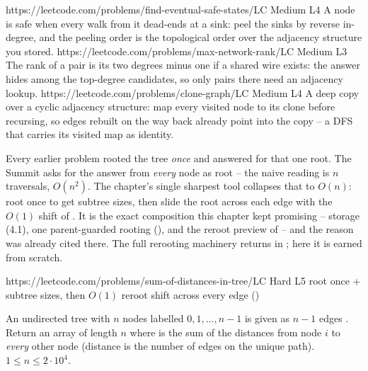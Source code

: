 \begin{mixedset}
    {https://leetcode.com/problems/find-eventual-safe-states/}{LC Medium L4}
    {A node is safe when every walk from it dead-ends at a sink: peel the sinks by
    reverse in-degree, and the peeling order is the topological order over the
    adjacency structure you stored.}
    {https://leetcode.com/problems/max-network-rank/}{LC Medium L3}
    {The rank of a pair is its two degrees minus one if a shared wire exists: the
    answer hides among the top-degree candidates, so only pairs there need an
    adjacency lookup.}
    {https://leetcode.com/problems/clone-graph/}{LC Medium L4}
    {A deep copy over a cyclic adjacency structure: map every visited node to its
    clone before recursing, so edges rebuilt on the way back already point into the
    copy -- a DFS that carries its visited map as identity.}
\end{mixedset}




\begin{notebox}
Every earlier problem rooted the tree \emph{once} and answered for that one root. The
Summit asks for the answer from \emph{every} node as root -- the naive reading is $n$
traversals, $O(n^2)$. The chapter's single sharpest tool collapses that to $O(n)$: root
once to get subtree sizes, then slide the root across each edge with the $O(1)$ shift of
. It is the exact composition this chapter kept promising -- storage
(4.1), one parent-guarded rooting (), and the reroot preview of
 -- and the reason  was already cited there. The
full rerooting machinery returns in ; here it is earned from scratch.
\end{notebox}

  {https://leetcode.com/problems/sum-of-distances-in-tree/}{LC Hard L5}
  {root once + subtree sizes, then $O(1)$ reroot shift across every edge ()}

\begin{problemstatement}
An undirected tree with $n$ nodes labelled $0,1,\dots,n-1$ is given as $n-1$ edges
. Return an array  of length $n$ where  is
the sum of the distances from node $i$ to \emph{every} other node (distance is the number
of edges on the unique path). $1 \le n \le 2\cdot10^{4}$.
\end{problemstatement}

